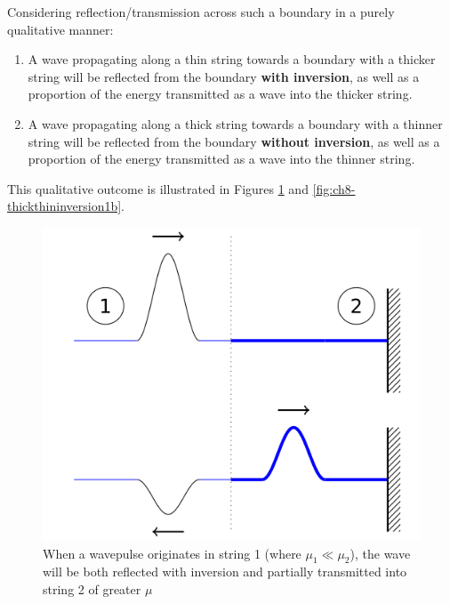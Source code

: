 \documentclass[
]{book}
\providecommand{\tightlist}{%
  \setlength{\itemsep}{0pt}\setlength{\parskip}{0pt}}
\begin{document}
Considering reflection/transmission across such a boundary in a purely qualitative manner:

\begin{enumerate}
\def\labelenumi{\arabic{enumi}.}
\tightlist
\item
  A wave propagating along a thin string towards a boundary with a thicker string will be reflected from the boundary \textbf{with inversion}, as well as a proportion of the energy transmitted as a wave into the thicker string.
\item
  A wave propagating along a thick string towards a boundary with a thinner string will be reflected from the boundary \textbf{without inversion}, as well as a proportion of the energy transmitted as a wave into the thinner string.
\end{enumerate}

This qualitative outcome is illustrated in Figures \ref{fig:ch8-thickthininversion1} and \ref{fig:ch8-thickthininversion1b}.

\begin{figure}

{\centering \includegraphics[width=0.7\linewidth]{visualisations/LaTeX/ch8-wavesonstrings1} 

}

\caption{When a wavepulse originates in string 1 (where $\mu_1 \ll \mu_2$), the wave will be both reflected with inversion and partially transmitted into string 2 of greater $\mu$}\label{fig:ch8-thickthininversion1}
\end{figure}
\end{document}
